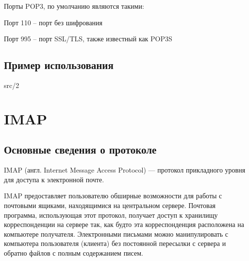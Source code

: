Порты POP3, по умолчанию являются такими:

Порт 110 – порт без шифрования

Порт 995 – порт SSL/TLS, также известный как POP3S

\subsection{Пример использования}
 {src/2}

\section{IMAP}

\subsection{Основные сведения о протоколе}
IMAP (англ. Internet Message Access Protocol) — протокол прикладного уровня для доступа к электронной почте.

IMAP предоставляет пользователю обширные возможности для работы с почтовыми ящиками, находящимися на центральном сервере. Почтовая программа, использующая этот протокол, получает доступ к хранилищу корреспонденции на сервере так, как будто эта корреспонденция расположена на компьютере получателя. Электронными письмами можно манипулировать с компьютера пользователя (клиента) без постоянной пересылки с сервера и обратно файлов с полным содержанием писем. 

